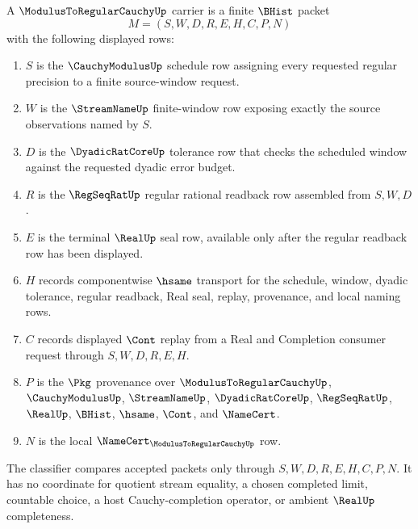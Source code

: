 \begin{definition}
\label{def:modulus-to-regular-cauchy-carrier}
A $\ModulusToRegularCauchyUp$ carrier is a finite $\BHist$ packet
$$
M=(S,W,D,R,E,H,C,P,N)
$$
with the following displayed rows:
\begin{enumerate}
\item $S$ is the $\CauchyModulusUp$ schedule row assigning every requested regular precision to a finite source-window request.
\item $W$ is the $\StreamNameUp$ finite-window row exposing exactly the source observations named by $S$.
\item $D$ is the $\DyadicRatCoreUp$ tolerance row that checks the scheduled window against the requested dyadic error budget.
\item $R$ is the $\RegSeqRatUp$ regular rational readback row assembled from $S,W,D$.
\item $E$ is the terminal $\RealUp$ seal row, available only after the regular readback row has been displayed.
\item $H$ records componentwise $\hsame$ transport for the schedule, window, dyadic tolerance, regular readback, Real seal, replay, provenance, and local naming rows.
\item $C$ records displayed $\Cont$ replay from a Real and Completion consumer request through $S,W,D,R,E,H$.
\item $P$ is the $\Pkg$ provenance over $\ModulusToRegularCauchyUp$, $\CauchyModulusUp$, $\StreamNameUp$, $\DyadicRatCoreUp$, $\RegSeqRatUp$, $\RealUp$, $\BHist$, $\hsame$, $\Cont$, and $\NameCert$.
\item $N$ is the local $\NameCert_{\ModulusToRegularCauchyUp}$ row.
\end{enumerate}
The classifier compares accepted packets only through $S,W,D,R,E,H,C,P,N$. It has no coordinate for quotient stream equality, a chosen completed limit, countable choice, a host Cauchy-completion operator, or ambient $\RealUp$ completeness.
\end{definition}

